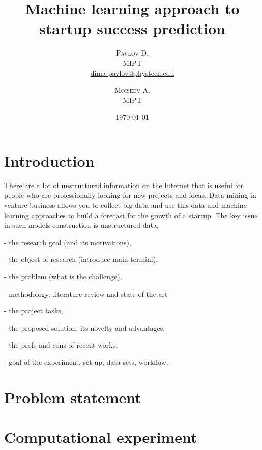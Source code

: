 \documentclass[twoside,twocolumn,12pt]{article}
\title{\textbf{\Huge{Machine learning approach to startup success prediction}}}
\author{%
\textsc{Pavlov D.} \\[1ex] 
\normalsize MIPT\\ 
\normalsize \href{mailto:dima-pavlov@phystech.edu}{dima-pavlov@phystech.edu}
\and 
\textsc{Moiseev A.} \\[1ex] 
\normalsize MIPT
}
\date{\today}
\theoremstyle{plain}
\theoremstyle{definition}
\begin{document}
\maketitle

\clearpage

\section{Introduction}

There are a lot of unstructured information on the Internet that is useful for people who are professionally-looking for new projects and ideas. Data mining in venture business allows you to collect big data and use this data and machine learning approaches to build a forecast for the growth of a startup. The key issue in such models construction is unstructured data,


- the research goal (and its motivations),

- the object of research (introduce main termini),

- the problem (what is the challenge),

- methodology: literature review and state-of-the-art

- the project tasks,

- the proposed solution, its novelty and advantages,

- the profs and cons of recent works,

- goal of the experiment, set up, data sets, workflow.

\section{Problem statement}

\section{Computational experiment}
\end{document}
